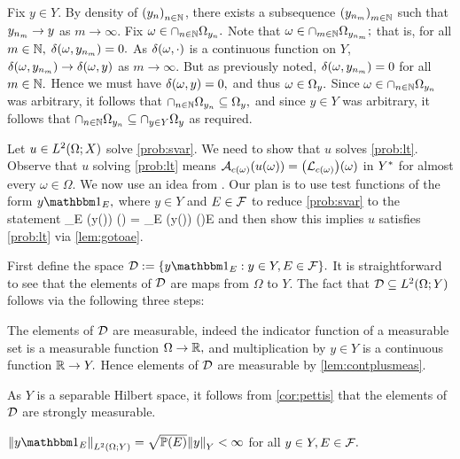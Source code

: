 Fix $y \in Y.$ By density of $\mleft(\yn\mright)_{n \in \NN}$, there exists a subsequence $\ynmseq$ such that $y_{n_{m}} \rightarrow y$ as $m \rightarrow \infty.$ Fix $\omega \in \cap_{n \in \mathbb N} \Omega_{y_{n}}.$ Note that $\omega \in \cap_{m \in \mathbb N} \Omega_{y_{n_{m}}};$ that is, for all $m \in \mathbb N,$ $\delta(\omega,y_{n_{m}}) =0.$ As $\delta(\omega,\cdot)$ is a continuous function on $Y$, $\delta(\omega,y_{n_{m}}) \rightarrow \delta(\omega,y)$ as $m \rightarrow \infty.$ But as previously noted, $\delta(\omega,y_{n_{m}})=0$ for all $m \in \mathbb N.$ Hence we must have $\delta(\omega,y)=0,$ and thus $\omega \in \Omega_{y}.$ Since $\omega \in \cap_{n \in \mathbb N} \Omega_{y_{n}}$ was arbitrary, it follows that $\cap_{n \in \mathbb N} \Omega_{y_{n}} \subseteq \Omega_{y},$ and since $y \in Y$ was arbitrary, it follows that $\cap_{n \in \mathbb N} \Omega_{y_{n}} \subseteq \cap_{y \in Y} \Omega_{y}$ as required.
\epf

Let $u \in \LtOX$ solve \cref{prob:svar}. We need to show that $u$ solves \cref{prob:lt}. Observe that $u$ solving \cref{prob:lt} means $\Acomega(u(\omega)) = \mleft(\Lcomega\mright)(\omega)$ in $Y^{*}$ for almost every $\omega \in \Omega.$ We now use an idea from \cite[Theorem 3.3]{Gi:10}. Our plan is to use test functions of the form $y\Ind{E},$ where $y \in Y$ and $E \in \mathcal F$ to reduce \cref{prob:svar} to the statement
\beqs
\int_E \big(y(\omega)\big) \dd\PP(\omega) = \int_E \mleft[\mleft(\Lcomega\mright)(\omega)\mright]\big(y(\omega)\big) \dd\PP(\omega)\quad \tforall E \in \cF
\eeqs
and then show this implies $u$ satisfies \cref{prob:lt} via \cref{lem:gotoae}.

First define the space
$\D := \set{y\Ind{E} \st y \in Y, E \in \cF}.$
It is straightforward to see that the elements of $\mathcal D$ are maps from $\Omega$ to $Y.$ The fact that $\D \subseteq \LtOY$ follows via the following three steps:

\ben
\item The elements of $\mathcal D$ are measurable, indeed the indicator function of a measurable set is a measurable function $\Omega\rightarrow\mathbb R,$ and multiplication by $y \in Y$ is a continuous function $\mathbb R\rightarrow Y.$ Hence elements of $\mathcal D$ are measurable by \cref{lem:contplusmeas}.
\item As $Y$ is a separable Hilbert space, it follows from \cref{cor:pettis} that the elements of $\mathcal D$ are strongly measurable.
\item $\NLtOY{y\Ind{E}} = \sqrt{\PP\mleft(E\mright)}\NY{y} < \infty$ for all $y \in Y, E \in \mathcal F.$
  \een

